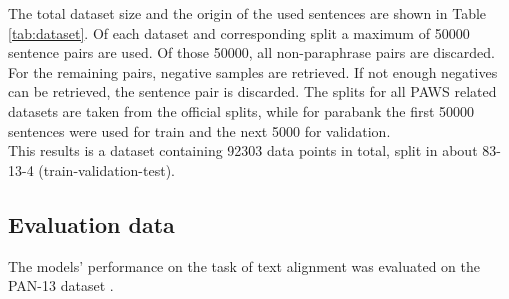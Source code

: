 \documentclass[11pt]{article}
\begin{document}
The total dataset size and the origin of the used sentences are shown in Table \ref{tab:dataset}.
Of each dataset and corresponding split a maximum of 50000 sentence pairs are used.
Of those 50000, all non-paraphrase pairs are discarded. 
For the remaining pairs, negative samples are retrieved.
If not enough negatives can be retrieved, the sentence pair is discarded.
The splits for all PAWS related datasets are taken from the official splits, while for parabank the first 50000 sentences were used for train and the next 5000 for validation.\\
This results is a dataset containing 92303 data points in total, split in about 83-13-4 (train-validation-test).

\begin{table}[!]
\caption{Origin datasets of used anchors and paraphrases for contrastive dataset. Also shows, train, validation, test split.}
\label{tab:dataset}
\end{table}



\subsection{Evaluation data}
The models' performance on the task of text alignment was evaluated on the PAN-13 dataset \cite{potthast:2013e}.
\end{document}
